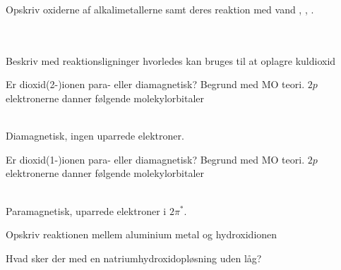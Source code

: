 \begin{flashcard}[Reaktion]{Opskriv oxiderne af alkalimetallerne samt deres reaktion med vand}
, , . \\ \vspace{7pt}
 \\
 \\
\end{flashcard}

\begin{flashcard}[Anvendelse]{Beskriv med reaktionsligninger hvorledes  kan bruges til at oplagre kuldioxid}
 \\
\end{flashcard}

\begin{flashcard}[Generelt]{Er dioxid(2-)ionen para- eller diamagnetisk? Begrund med MO teori.}
$2p$ elektronerne danner følgende molekylorbitaler
\begin{MOdiagram}[style=fancy,labels,AO-width=8pt,labels-fs=\footnotesize]
\end{MOdiagram}\\[-5pt]Diamagnetisk, ingen uparrede elektroner.
\end{flashcard}

\begin{flashcard}[Generelt]{Er dioxid(1-)ionen para- eller diamagnetisk? Begrund med MO teori.}
$2p$ elektronerne danner følgende molekylorbitaler
\begin{MOdiagram}[style=fancy,labels,AO-width=8pt,labels-fs=\footnotesize]
\end{MOdiagram}\\[-5pt]Paramagnetisk, uparrede elektroner i $2\pi^{*}$.
\end{flashcard}

\begin{flashcard}[Reaktion]{Opskriv reaktionen mellem aluminium metal og hydroxidionen}
\end{flashcard}

\begin{flashcard}[Reaktion]{Hvad sker der med en natriumhydroxidopløsning uden låg?}
\end{flashcard}


